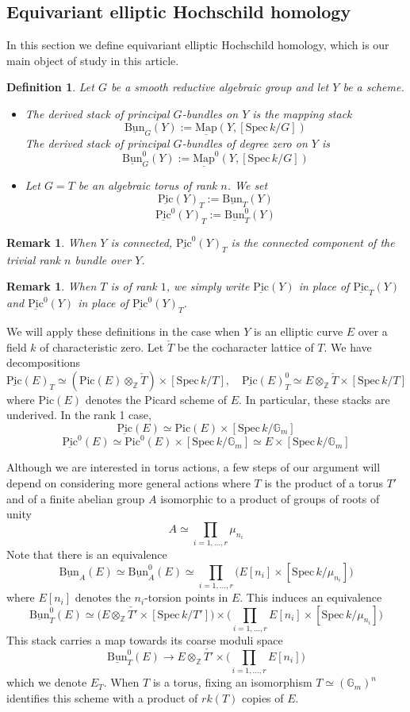 \documentclass[11pt,letterpaper]{amsart}
\newtheorem{definition}[dummy]{Definition}
\newtheorem{remark}[dummy]{Remark}
\newcommand{\bG}{\mathbb{G}}
\newcommand{\bZ}{\mathbb{Z}}
\newcommand{\Map}[2]{\underline{\mathrm{Map}}\left (#1,#2\right )}
\newcommand{\Mapo}[2]{\underline{\mathrm{Map}}^{0}\left (#1,#2\right )}
\newcommand{\Spec}{\mathrm{S}\mathrm{pec}\,}
\newcommand{\Pic}{\underline{\mathrm{Pic}}}
\newcommand{\Bun}{\underline{\mathrm{Bun}}}
\begin{document}
\subsection{Equivariant elliptic Hochschild homology}
In this section we define equivariant elliptic Hochschild homology,  which is our main object of study in this article. 
\begin{definition}
Let $G$ be a smooth reductive algebraic group and let $Y$ be a scheme.
\begin{itemize}
\item The \emph{derived stack of principal $G$-bundles} on   $Y$   is the mapping stack 
$$\Bun_G(Y):=\Map{Y}{[\Spec k/G]}$$ 
The \emph{derived stack of principal $G$-bundles of degree zero} on $Y$ is 
$$\Bun^0_G(Y):=\Mapo{Y}{[\Spec k/G]}$$
\item Let $G=T$ be an algebraic torus of rank $n$. We set 
$$\Pic(Y)_T:=\Bun_T(Y)$$
$$\Pic^0(Y)_T:=\Bun^0_{T}(Y)$$
\end{itemize}
\end{definition}
\begin{remark}
When $Y$ is connected, $\Pic^0(Y)_T$ is the connected component of the trivial rank $n$ bundle over $Y$.
\end{remark}
\begin{remark}
When $T$ is of rank $1$, we simply write $\Pic(Y)$ in place of $\Pic_T(Y)$ and  $\Pic^0(Y)$ in place of $\Pic^0(Y)_T$.
\end{remark}

We will apply these definitions in the case when $Y$ is an elliptic curve $E$ over a field $k$ of characteristic zero. 
Let $\check{T}$ be the cocharacter lattice of $T$. 
We have decompositions  
$$
\Pic(E)_T\simeq (\mathrm{Pic}(E)\otimes_{\bZ}\check{T})\times [\Spec k/T], \quad \Pic(E)^0_T\simeq E\otimes_{\bZ}\check{T}\times [\Spec k/T]
$$
where $\mathrm{Pic}(E)$ denotes the Picard scheme of $E$. In particular, these stacks are underived. In the rank 1 case, 
$$\Pic(E)\simeq\mathrm{Pic}(E)\times[\Spec k/\bG_m]$$ 
$$\Pic^0(E)\simeq \mathrm{Pic}^0(E)\times [\Spec k/\bG_m]\simeq E\times [\Spec k/\bG_m]$$

Although we are interested in torus actions, a few steps of our argument  will depend on considering more general actions where $T$  is the product of a torus $T'$ and of a finite abelian group $A$ isomorphic to a product of groups of roots of unity
$$
A \simeq \prod_{i=1, \ldots, r} \mu_{n_i}
$$
Note that there is an equivalence
$$
\Bun_A(E) \simeq \Bun^0_A(E) \simeq \prod_{i=1, \ldots, r} 
\big ( E[n_i] \times [\Spec k/\mu_{n_i}] \big )
$$
where $E[n_i]$ denotes the $n_i$-torsion points in $E$. This induces an equivalence 
$$
\Bun^0_T(E) \simeq \big ( E\otimes_{\bZ}\check{T'}\times [\Spec k/T'] \big ) \times \big ( \prod_{i=1, \ldots, r} E[n_i] \times [\Spec k/\mu_{n_i}] \big )
$$
This stack carries a map towards its coarse moduli space
$$
\Bun^0_T(E) \to E\otimes_{\bZ}\check{T'} \times \big ( \prod_{i=1, \ldots, r} E[n_i]   \big )
$$
which we denote  $E_T$. When $T$ is a torus, fixing an isomorphism $T\simeq(\bG_m)^n$ identifies this scheme with a product of $rk(T)$ copies of $E$.
\end{document}
